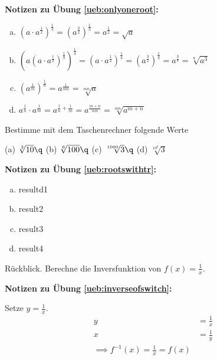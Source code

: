 \documentclass[%
11pt,%
twoside,%
titlepage,%
german,%
headsepline%
]{scrartcl}
\newcommand{\concatueb}[1]{ueb:#1}%
\newcommand{\concatlsg}[1]{lsg:#1}%
\newenvironment{lsg}[1]{%
    \par\noindent\textbf{Notizen zu Übung \ref{\concatueb{#1}}:}%
    \label{\concatlsg{#1}}\par
}{%
    \par%
}
\begin{document}
\begin{lsg}{onlyoneroot}
    \begin{enumerate}[a)]
      \item $(a\cdot a^\frac{1}{2})^\frac{1}{3}=(a^\frac{3}{2})^\frac{1}{3}=a^\frac{1}{2}=\sqrt{a}$
      \item $(a(a\cdot a^\frac{1}{2})^\frac{1}{3})^\frac{1}{4}=%
      (a\cdot a^\frac{1}{2})^\frac{1}{4}=(a^\frac{3}{2})^\frac{1}{4}=a^\frac{3}{8}=\sqrt[8]{a^3}$
      \item $(a^\frac{1}{m})^\frac{1}{n}=a^\frac{1}{nm}=\sqrt[mn]{a}$
      \item $a^\frac{1}{n}\cdot a^\frac{1}{m}=a^{\frac{1}{n}+\frac{1}{m}}=a^\frac{m+n}{nm}%
      =\sqrt[nm]{a^{m+n}}$
    \end{enumerate}
\end{lsg}

\begin{ueb}[TR]
  Bestimme mit dem Taschenrechner folgende Werte

(a) $\sqrt[3]{10}\q$ (b) $\sqrt[6]{100}\q$ (c) $\sqrt[1000]{3}\q$ (d) $\sqrt[10^6]{3}$

\begin{lsg}{rootswithtr}
  \begin{enumerate}[a)]
    \item resultd1
    \item result2
    \item result3
    \item result4
  \end{enumerate}
\end{lsg}

\end{ueb}

%

\begin{ueb}
  Rückblick. Berechne die Inversfunktion von $f(x)=\frac{1}{x}$.
\end{ueb}

\begin{lsg}{inverseofswitch}
  Setze $y=\frac{1}{x}$.
  \begin{align}
    y &= \frac{1}{x}\tag{$\cdot x$, $div y$}\\
    x &= \frac{1}{y}\\
    \implies f^{-1}(x)=\frac{1}{x}=f(x)
    \end{align}
\end{lsg}
\end{document}
